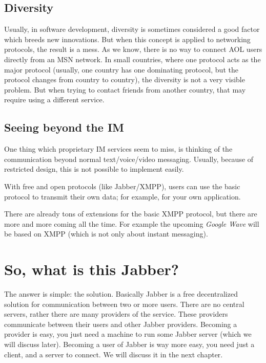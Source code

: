 \subsection{Diversity}
\label{ss:jim_client_server:dangers_proprietary:diversity}

Usually, in software development, diversity is sometimes considered a good
factor which breeds new innovations. But when this concept is applied to
networking protocols, the result is a mess. As we know, there is no way to
connect AOL users directly from an MSN network. In small countries, where one
protocol acts as the major protocol (usually, one country has one dominating
protocol, but the protocol changes from country to country), the diversity is
not a very visible problem. But when trying to contact friends from another
country, that may require using a dif\hbox{}ferent service.

 
\subsection{Seeing beyond the IM}
\label{ss:jim_client_server:dangers_proprietary:beyond_im}

One thing which proprietary IM services seem to miss, is thinking of the
communication beyond normal text/voice/video messaging. Usually, because of
restricted design, this is not possible to implement easily.

With free and open protocols (like Jabber/XMPP), users can use the basic
protocol to transmit their own data; for example, for your own application.

There are already tons of extensions for the basic XMPP protocol, but there are
more and more coming all the time. For example the upcoming \textit{Google Wave}
will be based on XMPP (which is not only about instant messaging).


\section{So, what is this Jabber?}
\label{s:jim_client_server:what_is_jabber}

The answer is simple: the solution. Basically Jabber is a free decentralized
solution for communication between two or more users. There are no central
servers, rather there are many providers of the service. These providers
communicate between their users and other Jabber providers. Becoming a provider
is easy, you just need a machine to run some Jabber server (which we will
discuss later). Becoming a user of Jabber is way more easy, you need just a
client, and a server to connect. We will discuss it in the next chapter.

